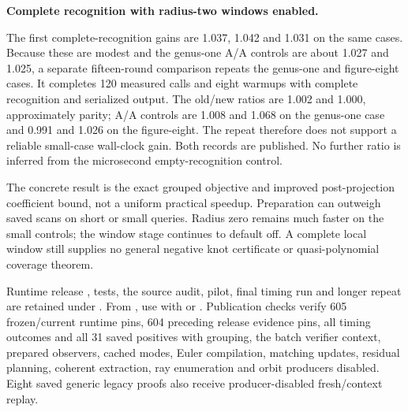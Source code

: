 \begin{samepage}
\noindent\textbf{Complete recognition with radius-two windows enabled.}

\end{samepage}

The first complete-recognition gains are 1.037, 1.042 and 1.031 on the
same cases. Because these are modest and the genus-one A/A controls are
about 1.027 and 1.025, a separate fifteen-round comparison repeats the
genus-one and figure-eight cases. It completes 120 measured calls and eight
warmups with complete recognition and serialized output. The old/new ratios
are 1.002 and 1.000, approximately parity; A/A controls are 1.008 and 1.068
on the genus-one case and 0.991 and 1.026 on the figure-eight. The repeat
therefore does not support a reliable small-case wall-clock gain. Both
records are published. No further ratio is inferred from the microsecond
empty-recognition control.

The concrete result is the exact grouped objective and improved
post-projection coefficient bound, not a uniform practical speedup.
Preparation can outweigh saved scans on short or small queries.
Radius zero remains much faster on the small controls; the window stage
continues to default off. A complete local window still supplies no general
negative knot certificate or quasi-polynomial coverage theorem.

\begin{sloppypar}
Runtime release , tests, the source audit, pilot, final timing
run and longer repeat are retained under .
From , use  with
 or .
Publication checks verify 605 frozen/current runtime pins, 604 preceding
release evidence pins, all timing outcomes and all 31 saved positives
with grouping, the batch verifier context, prepared observers, cached modes,
Euler compilation, matching updates, residual planning, coherent extraction,
ray enumeration and orbit producers disabled. Eight saved generic legacy
proofs also receive producer-disabled fresh/context replay.
\end{sloppypar}
